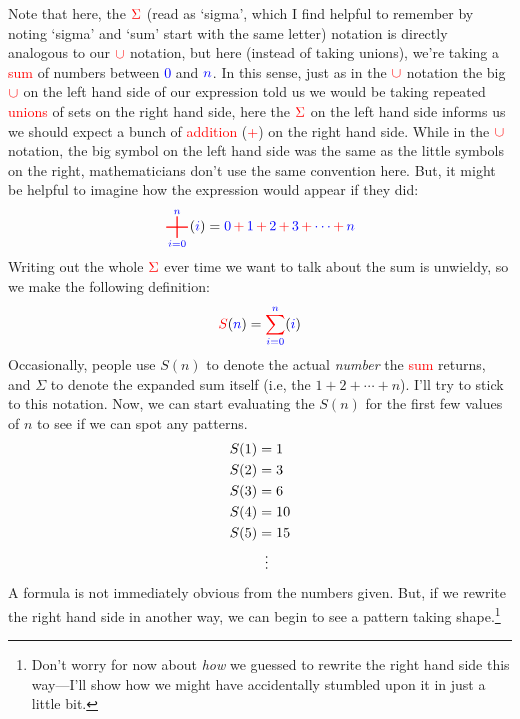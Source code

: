 \documentclass[10pt]{article}
\newcommand{\cvdots}[1][=]{\mathrel{\makebox[\widthof{#1}]{\vdots}}}
\DeclareMathOperator*{\bigplus}{\text{\fontsize{25}{35}\selectfont $+$}}
\theoremstyle{definition}
\begin{document}
Note that here, the $\color{red}\Sigma$ (read as `sigma', which I find helpful to remember by noting `sigma' and `sum' start with the same letter) notation is directly analogous to our $\color{red}\cup$ notation, but here (instead of taking unions), we're taking a \textcolor{red}{sum} of numbers between \textcolor{blue}{0} and $\textcolor{blue}{n}$.  In this sense, just as in the $\color{red}\cup$ notation the big $\color{red}\cup$ on the left hand side of our expression told us we would be taking repeated \textcolor{red}{unions} of sets on the right hand side, here the $\color{red}\Sigma$ on the left hand side informs us we should expect a bunch of \textcolor{red}{addition} (\textcolor{red}{+}) on the right hand side.  While in the $\color{red}\cup$ notation, the big symbol on the left hand side was the same as the little symbols on the right, mathematicians don't use the same convention here.  But, it might be helpful to imagine how the expression would appear if they did:
\[\raisebox{-.45\depth}{$\displaystyle\color{red}\bigplus^{{\color{blue}n}}_{{\color{blue}i=0}}$} ({\color{blue}i}) = \textcolor{blue}{0} \,{\color{red}+}\,\textcolor{blue}{1} \,{\color{red}+}\, \textcolor{blue}{2} \,{\color{red}+}\, \textcolor{blue}{3} \,{\color{red}+}\, \textcolor{blue}{\cdots} \,{\color{red}+}\, \textcolor{blue}{n}\]
Writing out the whole $\textcolor{red}{\Sigma}$ ever time we want to talk about the sum is unwieldy, so we make the following definition:
\[\textcolor{red}{S}(\textcolor{blue}{n}) = {\color{red}\sum^{{\color{blue}n}}_{\color{blue} i=0}} ({\color{blue}i})\]
Occasionally, people use $S(n)$ to denote the actual \emph{number} the \textcolor{red}{sum} returns, and $\Sigma$ to denote the expanded sum itself (i.e, the $1+2+\cdots+n$).  I'll try to stick to this notation.  Now, we can start evaluating the $S(n)$ for the first few values of $n$ to see if we can spot any patterns.
\begin{align*}
S(1) &= 1 \\
S(2) &= 3 \\
S(3) &= 6 \\
S(4) &= 10 \\
S(5) &= 15 \\
&\cvdots
\end{align*}
A formula is not immediately obvious from the numbers given.  But, if we rewrite the right hand side in another way, we can begin to see a pattern taking shape.\footnote{Don't worry for now about \emph{how} we guessed to rewrite the right hand side this way---I'll show how we might have accidentally stumbled upon it in just a little bit.}
\end{document}
